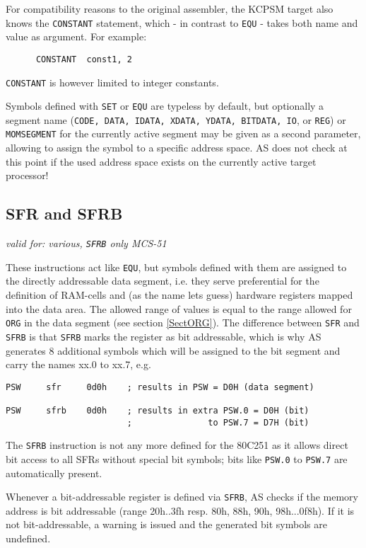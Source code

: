 \documentclass[12pt,twoside]{report}
\makeatletter
\newcommand{\tty}[1]{{\tt #1}}
\newcommand{\ttindex}[1]{\index{#1@{\tt #1}}}
\makeatother
\begin{document}
For compatibility reasons to the original assembler, the KCPSM target also
knows the {\tt CONSTANT} statement, which - in contrast to \tty{EQU} -
takes both name and value as argument.  For example:
\begin{verbatim}
      CONSTANT  const1, 2 
\end{verbatim}
{\tt CONSTANT} is however limited to integer constants.

Symbols defined with \tty{SET} or \tty{EQU} are typeless by default, but
optionally a segment name (\tty{CODE, DATA, IDATA, XDATA, YDATA, BITDATA,
IO}, or \tty{REG}) or \tty{MOMSEGMENT} for the currently active segment
may be given as a second parameter, allowing to assign the symbol to a
specific address space.  AS does not check at this point if the used 
address space exists on the currently active target processor!


\subsection{SFR and SFRB}
\ttindex{SFR}\ttindex{SFRB}

{\em valid for: various, \tty{SFRB} only MCS-51}

These instructions act like \tty{EQU}, but symbols defined with them are
assigned to the directly addressable data segment, i.e. they serve
preferential for the definition of RAM-cells and (as the name lets guess)
hardware registers mapped into the data area.  The allowed range of values
is equal to the range allowed for \tty{ORG} in the data segment (see
section \ref{SectORG}).  The difference between \tty{SFR} and \tty{SFRB}
is that \tty{SFRB} marks the register as bit addressable, which is why AS
generates 8 additional symbols which will be assigned to the bit segment
and carry the names xx.0 to xx.7, e.g.
\begin{verbatim}
PSW     sfr     0d0h    ; results in PSW = D0H (data segment)

PSW     sfrb    0d0h    ; results in extra PSW.0 = D0H (bit)
                        ;               to PSW.7 = D7H (bit)
\end{verbatim}
The \tty{SFRB} instruction is not any more defined for the 80C251 as it
allows direct bit access to all SFRs without special bit symbols; bits
like \tty{PSW.0} to \tty{PSW.7} are automatically present.

Whenever a bit-addressable register is defined via \tty{SFRB}, AS checks
if the memory address is bit addressable (range 20h..3fh resp. 80h, 88h,
90h, 98h...0f8h).  If it is not bit-addressable, a warning is issued and
the generated bit symbols are undefined.
\end{document}
